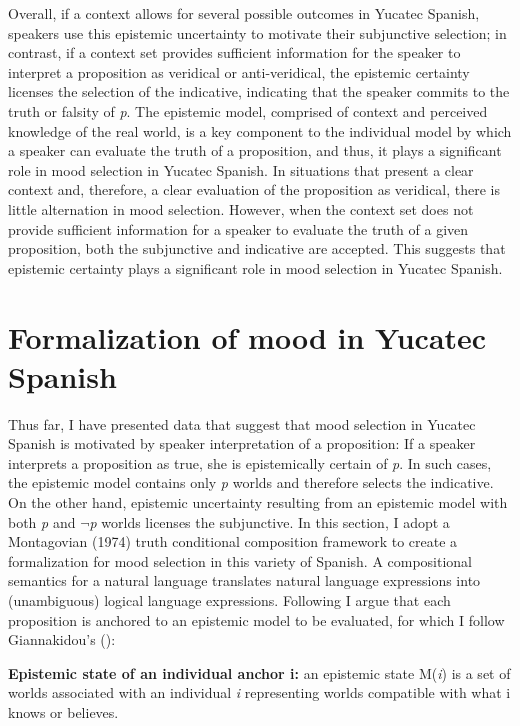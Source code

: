 \documentclass[output=paper,colorlinks,citecolor=brown,
]{langscibook}
\begin{document}
Overall, if a context allows for several possible outcomes in Yucatec Spanish, speakers use this epistemic uncertainty to motivate their subjunctive selection; in contrast, if a context set provides sufficient information for the speaker to interpret a proposition as veridical or anti-veridical, the epistemic certainty licenses the selection of the indicative, indicating that the speaker commits to the truth or falsity of \textit{p}. The epistemic model, comprised of context and perceived knowledge of the real world, is a key component to the individual model by which a speaker can evaluate the truth of a proposition, and thus, it plays a significant role in mood selection in Yucatec Spanish. In situations that present a clear context and, therefore, a clear evaluation of the proposition as veridical, there is little alternation in mood selection. However, when the context set does not provide sufficient information for a speaker to evaluate the truth of a given proposition, both the subjunctive and indicative are accepted. This suggests that epistemic certainty plays a significant role in mood selection in Yucatec Spanish. 

\section{Formalization of mood in Yucatec Spanish}

Thus far, I have presented data that suggest that mood selection in Yucatec Spanish is motivated by speaker interpretation of a proposition: If a speaker interprets a proposition as true, she is epistemically certain of \textit{p}. In such cases, the epistemic model contains only \textit{p }worlds\textit{ }and therefore selects the indicative. On the other hand, epistemic uncertainty resulting from an epistemic model with both \textit{p} and $\neg$\textit{p} worlds licenses the subjunctive. In this section, I adopt a Montagovian (1974) truth conditional composition framework to create a formalization for mood selection in this variety of Spanish. A compositional semantics for a natural language translates natural language expressions into (unambiguous) logical language expressions. Following \citet{Giannakidou2002,Giannakidou2006,Giannakidou2015} I argue that each proposition is anchored to an epistemic model to be evaluated, for which I follow Giannakidou's (\citeyear[1889]{Giannakidou2009}):

\begin{exe}
    \ex\label{ex:bove:20}
     \textbf{Epistemic state of an individual anchor i:} an epistemic state M(\textit{i}) is a set of worlds associated with an individual \textit{i} representing worlds compatible with what i knows or believes. 
\end{exe}
\end{document}
